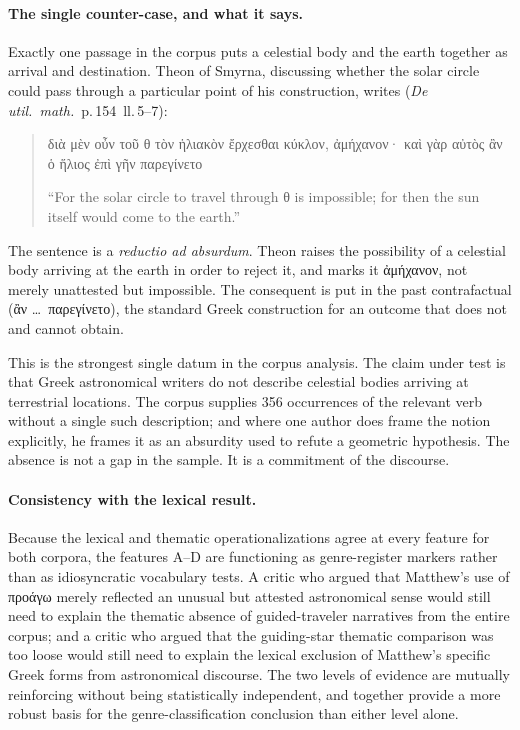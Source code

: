 \documentclass[11pt,a4paper]{article}
\newcommand{\grk}[1]{{\fontencoding{LGR}\selectfont #1}}
\newcommand{\grk}[1]{{\greekfont #1}}
\begin{document}
\paragraph{The single counter-case, and what it says.}

Exactly one passage in the corpus puts a celestial body and the earth
together as arrival and destination. Theon of Smyrna, discussing whether the
solar circle could pass through a particular point of his construction,
writes (\textit{De util.\ math.}~p.\,154~ll.\,5--7):

\begin{quote}
\grk{διὰ μὲν οὖν τοῦ θ τὸν ἡλιακὸν ἔρχεσθαι κύκλον, ἀμήχανον· καὶ γὰρ αὐτὸς
ἂν ὁ ἥλιος ἐπὶ γῆν παρεγίνετο}

``For the solar circle to travel through \grk{θ} is impossible; for then the
sun itself would come to the earth.''
\end{quote}

The sentence is a \emph{reductio ad absurdum}. Theon raises the possibility
of a celestial body arriving at the earth in order to reject it, and marks it
\grk{ἀμήχανον}, not merely unattested but impossible. The consequent is put
in the past contrafactual (\grk{ἂν \dots\ παρεγίνετο}), the standard Greek
construction for an outcome that does not and cannot obtain.

This is the strongest single datum in the corpus analysis. The claim under
test is that Greek astronomical writers do not describe celestial bodies
arriving at terrestrial locations. The corpus supplies 356 occurrences of the
relevant verb without a single such description; and where one author does
frame the notion explicitly, he frames it as an absurdity used to refute a
geometric hypothesis. The absence is not a gap in the sample. It is a
commitment of the discourse.

\paragraph{Consistency with the lexical result.}

Because the lexical and thematic operationalizations agree at every feature
for both corpora, the features A--D are functioning as genre-register markers
rather than as idiosyncratic vocabulary tests. A critic who argued that
Matthew's use of \grk{προάγω} merely reflected an unusual but attested
astronomical sense would still need to explain the thematic absence of
guided-traveler narratives from the entire corpus; and a critic who argued
that the guiding-star thematic comparison was too loose would still need to
explain the lexical exclusion of Matthew's specific Greek forms from
astronomical discourse. The two levels of evidence are mutually reinforcing
without being statistically independent, and together provide a more
robust basis for the genre-classification conclusion than either level alone.
\end{document}
